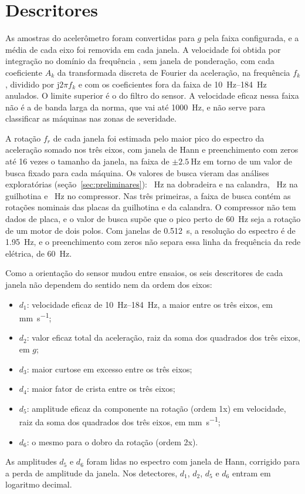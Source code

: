 \section{Descritores}\label{sec:descritores}

As amostras do acelerômetro foram convertidas para $g$ pela faixa configurada, e a média de cada eixo foi removida em cada janela. A velocidade foi obtida por integração no domínio da frequência \cite{brandt2014}, sem janela de ponderação, com cada coeficiente $A_k$ da transformada discreta de Fourier da aceleração, na frequência $f_k$, dividido por $\mathrm{j}2\pi f_k$ e com os coeficientes fora da faixa de \SIrange{10}{184}{\hertz} anulados. O limite superior é o do filtro do sensor. A velocidade eficaz nessa faixa não é a de banda larga da norma, que vai até \SI{1000}{\hertz}, e não serve para classificar as máquinas nas zonas de severidade.

A rotação $f_r$ de cada janela foi estimada pelo maior pico do espectro da aceleração somado nos três eixos, com janela de Hann e preenchimento com zeros até \num{16} vezes o tamanho da janela, na faixa de $\pm\SI{2,5}{\hertz}$ em torno de um valor de busca fixado para cada máquina. Os valores de busca vieram das análises exploratórias (seção~\ref{sec:preliminares}): \campoBuscaDobradeiraUm~Hz na dobradeira e na calandra, \campoBuscaGuilhotinaUm~Hz na guilhotina e \campoBuscaCompressorUm~Hz no compressor. Nas três primeiras, a faixa de busca contém as rotações nominais das placas da guilhotina e da calandra. O compressor não tem dados de placa, e o valor de busca supõe que o pico perto de \SI{60}{\hertz} seja a rotação de um motor de dois polos. Com janelas de \SI{0,512}{\second}, a resolução do espectro é de \SI{1,95}{\hertz}, e o preenchimento com zeros não separa essa linha da frequência da rede elétrica, de \SI{60}{\hertz}.

Como a orientação do sensor mudou entre ensaios, os seis descritores de cada janela não dependem do sentido nem da ordem dos eixos:
\begin{itemize}
  \item $d_1$: velocidade eficaz de \SIrange{10}{184}{\hertz}, a maior entre os três eixos, em \si{\milli\meter\per\second};
  \item $d_2$: valor eficaz total da aceleração, raiz da soma dos quadrados dos três eixos, em $g$;
  \item $d_3$: maior curtose em excesso entre os três eixos;
  \item $d_4$: maior fator de crista entre os três eixos;
  \item $d_5$: amplitude eficaz da componente na rotação (ordem 1x) em velocidade, raiz da soma dos quadrados dos três eixos, em \si{\milli\meter\per\second};
  \item $d_6$: o mesmo para o dobro da rotação (ordem 2x).
\end{itemize}
As amplitudes $d_5$ e $d_6$ foram lidas no espectro com janela de Hann, corrigido para a perda de amplitude da janela. Nos detectores, $d_1$, $d_2$, $d_5$ e $d_6$ entram em logaritmo decimal.

